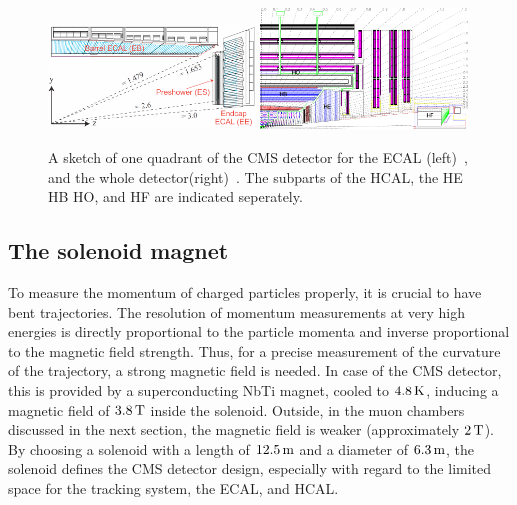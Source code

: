 \begin{figure}[tbp]
 \centering
 \includegraphics[width=0.49\textwidth]{figures/general/ecal}
 \includegraphics[width=0.49\textwidth]{figures/general/hcal}
 \caption{A sketch of one quadrant of the CMS detector for the ECAL (left)~\cite{ECALPicture}, and the whole detector(right)~\cite{CMS}. The subparts of the HCAL, the HE HB HO, and HF are indicated seperately.}
 \label{fig:etaPlaneCMS}
\end{figure}

\subsection{The solenoid magnet}
To measure the momentum of charged particles properly, it is crucial to have bent trajectories. The resolution of momentum measurements at very high energies is directly proportional to the particle momenta and inverse proportional to the magnetic field strength. Thus, for a precise measurement of the curvature of the trajectory, a strong magnetic field is needed. In case of the CMS detector, this is provided by a superconducting NbTi magnet, cooled to $4.8\,\text{K}$, inducing a magnetic field of $3.8\,\text{T}$ inside the solenoid. Outside, in the muon chambers discussed in the next section, the magnetic field is weaker (approximately $2\,\text{T}$). By choosing a solenoid with a length of $12.5\,\text{m}$ and a diameter of $6.3\,\text{m}$, the solenoid defines the CMS detector design, especially with regard to the limited space for the tracking system, the ECAL, and HCAL.



